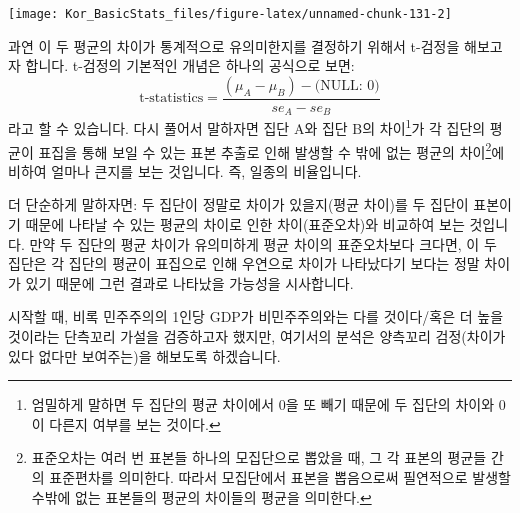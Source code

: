 \documentclass[]{book}
\newenvironment{Shaded}{\begin{snugshade}}{\end{snugshade}}
\newcommand{\CommentTok}[1]{\textcolor[rgb]{0.56,0.35,0.01}{\textit{#1}}}
\newcommand{\DataTypeTok}[1]{\textcolor[rgb]{0.13,0.29,0.53}{#1}}
\newcommand{\DecValTok}[1]{\textcolor[rgb]{0.00,0.00,0.81}{#1}}
\newcommand{\KeywordTok}[1]{\textcolor[rgb]{0.13,0.29,0.53}{\textbf{#1}}}
\newcommand{\NormalTok}[1]{#1}
\newcommand{\OperatorTok}[1]{\textcolor[rgb]{0.81,0.36,0.00}{\textbf{#1}}}
\newcommand{\OtherTok}[1]{\textcolor[rgb]{0.56,0.35,0.01}{#1}}
\newcommand{\StringTok}[1]{\textcolor[rgb]{0.31,0.60,0.02}{#1}}
\let\rmarkdownfootnote\footnote%
\def\footnote{\protect\rmarkdownfootnote}
\begin{document}
\begin{center}\texttt{[image: Kor\_BasicStats\_files/figure-latex/unnamed-chunk-131-2]} \end{center}

과연 이 두 평균의 차이가 통계적으로 유의미한지를 결정하기 위해서 t-검정을 해보고자 합니다. t-검정의 기본적인 개념은 하나의 공식으로 보면:\[
\text{t-statistics} = \frac{(\mu_A - \mu_B) - \text{(NULL: 0)}}{se_A - se_B}\]
라고 할 수 있습니다. 다시 풀어서 말하자면 집단 A와 집단 B의 차이\footnote{엄밀하게 말하면 두 집단의 평균 차이에서 0을 또 빼기 때문에 두 집단의 차이와 0이 다른지 여부를 보는 것이다.}가 각 집단의 평균이 표집을 통해 보일 수 있는 표본 추출로 인해 발생할 수 밖에 없는 평균의 차이\footnote{표준오차는 여러 번 표본들 하나의 모집단으로 뽑았을 때, 그 각 표본의 평균들 간의 표준편차를 의미한다. 따라서 모집단에서 표본을 뽑음으로써 필연적으로 발생할 수밖에 없는 표본들의 평균의 차이들의 평균을 의미한다.}에 비하여 얼마나 큰지를 보는 것입니다. 즉, 일종의 비율입니다.

더 단순하게 말하자면: 두 집단이 정말로 차이가 있을지(평균 차이)를 두 집단이 표본이기 때문에 나타날 수 있는 평균의 차이로 인한 차이(표준오차)와 비교하여 보는 것입니다. 만약 두 집단의 평균 차이가 유의미하게 평균 차이의 표준오차보다 크다면, 이 두 집단은 각 집단의 평균이 표집으로 인해 우연으로 차이가 나타났다기 보다는 정말 차이가 있기 때문에 그런 결과로 나타났을 가능성을 시사합니다.

시작할 때, 비록 민주주의의 1인당 GDP가 비민주주의와는 다를 것이다/혹은 더 높을 것이라는 단측꼬리 가설을 검증하고자 했지만, 여기서의 분석은 양측꼬리 검정(차이가 있다 없다만 보여주는)을 해보도록 하겠습니다.

\begin{Shaded}
\end{Shaded}
\end{document}
